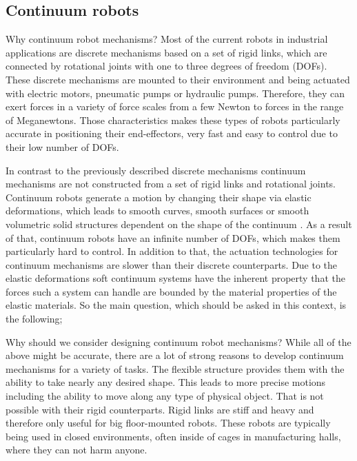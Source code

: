 \subsection*{Continuum robots}
Why continuum robot mechanisms? Most of the current robots in industrial applications are discrete mechanisms based on a set of rigid links, which are connected by rotational joints with one to three degrees of freedom (DOFs).
These discrete mechanisms are mounted to their environment and being actuated with electric motors, pneumatic pumps or hydraulic pumps. Therefore, they can exert forces in a 
variety of force scales from a few Newton to forces in the range of Meganewtons. 
Those characteristics makes these types of robots particularly accurate in positioning their end-effectors, very fast and easy to control due to their low number of DOFs. 
\par
In contrast to the previously described discrete mechanisms continuum mechanisms are not constructed from a set of rigid links and rotational joints. 
Continuum robots generate a motion by changing their shape via elastic deformations, which leads to smooth curves,
 smooth surfaces or smooth volumetric solid structures dependent on the shape of the continuum \cite{Robinson1999_conf}. As a result of that, continuum robots have an infinite number of 
 DOFs, which makes them particularly hard to control.
In addition to that, the actuation technologies for continuum mechanisms are slower than their discrete counterparts. Due to the 
 elastic deformations soft continuum systems have the inherent property that the forces such a system can handle are bounded by the material properties of the elastic materials.
So the main question, which should be asked in this context, is the following; \par
Why should we consider designing continuum robot mechanisms?
%
While all of the above might be accurate, there are a lot of strong reasons to develop continuum mechanisms for a variety of tasks. The flexible structure provides them
 with the ability to take nearly any desired shape. This leads to more precise motions including the ability to move along any type of physical object. That is not possible with 
 their rigid counterparts. Rigid links are stiff and heavy and therefore only useful for big floor-mounted robots. These robots are typically being used in closed environments,
 often inside of cages in manufacturing halls, where they can not harm anyone. 
 
 
